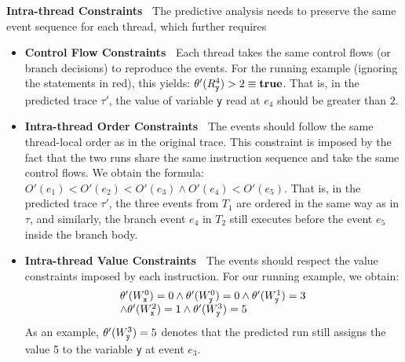 {\bf Intra-thread Constraints\ } The predictive analysis needs to preserve the same event sequence for each thread, which further requires 

\begin{itemize}
\item {\bf Control Flow Constraints\ } Each thread takes the same control flows (or branch decisions) to reproduce the events.
 For the running example (ignoring the statements in red), this yields: $\theta'(R_{\tt y}^4) > 2 \equiv {\bf true}$.
That is, in the predicted trace $\tau'$, the value of variable {\tt y} read at $e_4$ should be greater than $2$. 


\item {\bf Intra-thread Order Constraints\ } The events should follow the same thread-local order as in the original trace. This constraint is imposed by the fact that the two runs share the same instruction sequence and take the same control flows. 
We obtain the  formula: $O'(e_1) < O'(e_2) < O'(e_3) \wedge O'(e_4) < O'(e_5)$.
That is, in the predicted trace $\tau'$, the three events from $T_1$ are ordered in the same way as in $\tau$, and similarly, the branch event $e_4$ in $T_2$ still executes before the event $e_5$ inside the branch body.

\item {\bf Intra-thread Value Constraints\ } The events should respect the value constraints imposed by each instruction.
 For our running example, we obtain:
$$
\begin{array}{l}
	\theta'(W_{\tt x}^0) = 0 \wedge \theta'(W_{\tt y}^0) = 0 \wedge \theta'(W_{\tt y}^1) = 3 \\ 
	\wedge	\theta'(W_{\tt x}^2) = 1 \wedge \theta'(W_{\tt y}^3) = 5
	\end{array}
$$
As an example, $\theta'(W_{\tt y}^3)= 5$ denotes that the predicted run still assigns the value 5 to the variable {\tt y}  at event $e_3$.
\end{itemize}





